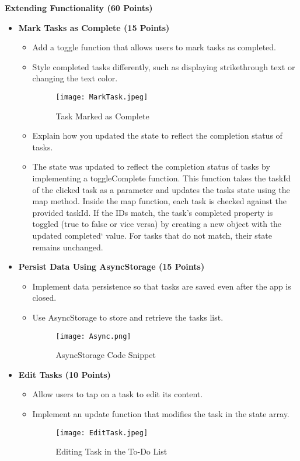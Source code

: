\documentclass{article}
\begin{document}
\textbf{Extending Functionality (60 Points)}
\begin{itemize}
    \item \textbf{Mark Tasks as Complete (15 Points)}
    \begin{itemize}
        \item Add a toggle function that allows users to mark tasks as completed.
        \item Style completed tasks differently, such as displaying strikethrough text or changing the text color.
        \begin{figure}[H]
            \centering
            \texttt{[image: MarkTask.jpeg]}
            \caption{Task Marked as Complete}
        \end{figure}
     
        \item Explain how you updated the state to reflect the completion status of tasks.
        \item The state was updated to reflect the completion status of tasks by implementing a toggleComplete function. This function takes the taskId of the clicked task as a parameter and updates the tasks state using the map method. Inside the map function, each task is checked against the provided taskId. If the IDs match, the task's completed property is toggled (true to false or vice versa) by creating a new object with the updated completed` value. For tasks that do not match, their state remains unchanged.
    \end{itemize}
    
    \item \textbf{Persist Data Using AsyncStorage (15 Points)}
    \begin{itemize}
        \item Implement data persistence so that tasks are saved even after the app is closed.
        \item Use AsyncStorage to store and retrieve the tasks list.
        \begin{figure}[H]
            \centering
            \texttt{[image: Async.png]}
            \caption{AsyncStorage Code Snippet}
        \end{figure}
    \end{itemize}
    
    \item \textbf{Edit Tasks (10 Points)}
    \begin{itemize}
        \item Allow users to tap on a task to edit its content.
        \item Implement an update function that modifies the task in the state array.
        \begin{figure}[H]
            \centering
            \texttt{[image: EditTask.jpeg]}
            \caption{Editing Task in the To-Do List}
        \end{figure}


\end{itemize}
\end{itemize}
\end{document}
